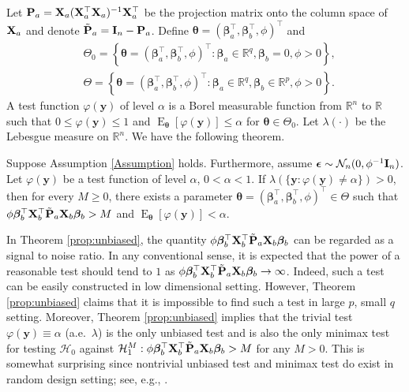 \documentclass[smallextended]{svjour3}       %
\DeclareMathOperator{\myE}{E}
\newcommand{\By}{\mathbf{y}}    \newcommand{\Bz}{\mathbf{z}}
\newcommand{\bfsym}[1]{\ensuremath{\boldsymbol{#1}}}
\def\bbeta{\bfsym \beta}
\def\btheta{\bfsym {\theta}}           \def\bTheta {\bfsym {\Theta}}
\begin{document}
Let $\mathbf{P}_a=\mathbf{X}_a(\mathbf{X}_a^\top \mathbf{X}_a)^{-1} \mathbf{X}_a^\top$ be the projection matrix onto the column space of $\mathbf{X}_a$ and denote $\tilde {\mathbf{P}}_a = \mathbf{I}_n-\mathbf{P}_a$.
Define $\btheta =(\bbeta_a^\top , \bbeta_b^\top , \phi)^\top$ and 
\begin{equation*}
    \begin{split}
        &\Theta_0 = \left\{\btheta=(\bbeta_a^\top , \bbeta_b^\top , \phi)^\top: \bbeta_a \in \mathbb R^{q}, \bbeta_b=0, \phi>0\right\},
    \\
    &\Theta = \left\{\btheta=(\bbeta_a^\top , \bbeta_b^\top , \phi)^\top: \bbeta_a \in \mathbb R^{q}, \bbeta_b\in \mathbb R^p, \phi>0\right\}.
    \end{split}
\end{equation*}
A test function $\varphi(\By)$ of level $\alpha$ is a Borel measurable function from $\mathbb R^n$ to $\mathbb R$ such that $0\leq \varphi(\By) \leq 1$ and $\myE_{\btheta} [\varphi(\By)]\leq \alpha$ for $\btheta\in \Theta_0$.
Let $\lambda(\cdot)$ be the Lebesgue measure on $\mathbb R^n$.
We have the following theorem.
\begin{theorem}\label{prop:unbiased}
    Suppose Assumption \ref{Assumption} holds.
    Furthermore, assume $\bepsilon\sim \mathcal N_n (0, \phi^{-1}\BI_n)$.
    Let $\varphi(\By)$ be a test function of level $\alpha$, $0 <\alpha <1$.
    If $\lambda(\{\By:\varphi(\By)\neq \alpha\})>0$, then for every $M\geq 0$, there exists a parameter $\btheta=(\bbeta_a^\top,\bbeta_b^\top,\phi)^\top \in \Theta$ such that $\phi\bbeta_b^\top \BX_b^\top \tilde \BP_a \BX_b \bbeta_b > M$ and $\myE_{\btheta} [\varphi(\By)]< \alpha$.
\end{theorem}
In Theorem \ref{prop:unbiased}, the quantity $\phi \bbeta_b^\top \BX_b^\top \tilde \BP_a \BX_b \bbeta_b$ can be regarded as a signal to noise ratio.
In any conventional sense, it is expected that the power of a reasonable test should tend to $1$ as $\phi \bbeta_b^\top \BX_b^\top \tilde \BP_a \BX_b \bbeta_b \to \infty$.
Indeed, such a test can be easily constructed in low dimensional setting.
However, Theorem \ref{prop:unbiased} claims that it is impossible to find such a test in large $p$, small $q$ setting.
Moreover, Theorem \ref{prop:unbiased} implies that the trivial test $\varphi(\By) \equiv \alpha$ (a.e.\ $\lambda$) is the only unbiased test and is also the only minimax test for testing $\mathcal H_0 $ against $\mathcal H_1^{M}: \phi\bbeta_b^\top \BX_b^\top \tilde \BP_a \BX_b \bbeta_b > M$ for any $M > 0$.
This is somewhat surprising since nontrivial unbiased test and minimax test do exist in random design setting; see, e.g., \cite{ITV2010}.
\end{document}
